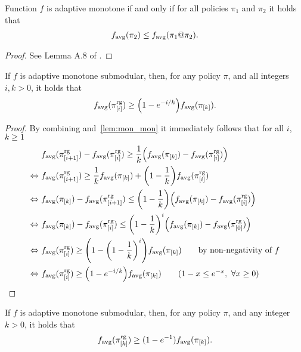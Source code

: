 \let\oldthelemma\thelemma
\renewcommand{\thelemma}{GK}
\begin{lemma}\label{lem:mon_mon}
  Function $f$ is adaptive monotone if and only if for all policies $\pi_1$ and $\pi_2$ it holds that
  \begin{align*}
    f_{\mathrm{avg}}(\pi_2) \leq f_{\mathrm{avg}}(\pi_1 @ \pi_2).
  \end{align*}
\end{lemma}
\begin{proof}
See Lemma A.8 of \citet{golovin11}.
\end{proof}
\let\thelemma\oldthelemma

\begin{theorem}
  If $f$ is adaptive monotone submodular, then, for any policy $\pi$, and all integers $i, k > 0$, it holds that
  \begin{align*}
    \favg(\pigi) \geq \left(1 - e^{-i/k}\right)\favg(\pik).
  \end{align*}
\end{theorem}
\begin{proof}
  By combining  and~\ref{lem:mon_mon} it immediately follows that for all $i$, $k \geq 1$
  {\small
  \begin{align*}
                   &\ \favg(\pigii) - \favg(\pigi) \geq \frac{1}{k}\left(\favg(\pik) - \favg(\pigi)\right)\\
    \Leftrightarrow&\ \favg(\pigii) \geq \frac{1}{k}\favg(\pik) + \left(1 - \frac{1}{k}\right) \favg(\pigi)\\
    \Leftrightarrow&\ \favg(\pik) - \favg(\pigii) \leq \left(1 - \frac{1}{k}\right)\left(\favg(\pik) - \favg(\pigi)\right)\\
    \Leftrightarrow&\ \favg(\pik) - \favg(\pigi) \leq \left(1 - \frac{1}{k}\right)^{i}\left(\favg(\pik) - \favg(\pigo)\right)\\
    \Leftrightarrow&\ \favg(\pigi) \geq \left(1 - \left(1 - \frac{1}{k}\right)^{i}\right)\favg(\pik)\tag*{by non-negativity of $f$}\\
    \Leftrightarrow&\ \favg(\pigi) \geq \left(1 - e^{-i/k}\right)\favg(\pik)\tag*{($1 - x \leq e^{-x},\ \forall x \geq 0$)}
  \end{align*}
  }
\end{proof}

\begin{cor}
  If $f$ is adaptive monotone submodular, then, for any policy $\pi$, and any integer $k > 0$, it holds that
  \begin{align*}
    f_{\mathrm{avg}}(\pi^{\textrm{rg}}_{[k]}) \geq (1 - e^{-1})f_{\mathrm{avg}}(\pi_{[k]}).
  \end{align*}
\end{cor}

